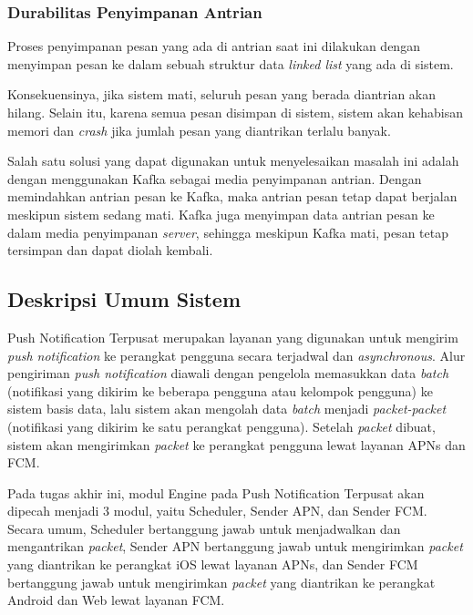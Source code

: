 \subsubsection{Durabilitas Penyimpanan Antrian}
\par Proses penyimpanan pesan yang ada di antrian saat ini dilakukan dengan menyimpan pesan ke dalam sebuah struktur data \textit{linked list} yang ada di sistem.
\par Konsekuensinya, jika sistem mati, seluruh pesan yang berada diantrian akan hilang. Selain itu, karena semua pesan disimpan di sistem, sistem akan kehabisan memori dan \textit{crash} jika jumlah pesan yang diantrikan terlalu banyak.
\par Salah satu solusi yang dapat digunakan untuk menyelesaikan masalah ini adalah dengan menggunakan Kafka sebagai media penyimpanan antrian. Dengan memindahkan antrian pesan ke Kafka, maka antrian pesan tetap dapat berjalan meskipun sistem sedang mati. Kafka juga menyimpan data antrian pesan ke dalam media penyimpanan \textit{server}, sehingga meskipun Kafka mati, pesan tetap tersimpan dan dapat diolah kembali.

\subsection{Deskripsi Umum Sistem}
\par Push Notification Terpusat merupakan layanan yang digunakan untuk mengirim \textit{push notification} ke perangkat pengguna secara terjadwal dan \textit{asynchronous}. Alur pengiriman \textit{push notification} diawali dengan pengelola memasukkan data \textit{batch} (notifikasi yang dikirim ke beberapa pengguna atau kelompok pengguna) ke sistem basis data, lalu sistem akan mengolah data \textit{batch} menjadi \textit{packet-packet} (notifikasi yang dikirim ke satu perangkat pengguna). Setelah \textit{packet} dibuat, sistem akan mengirimkan \textit{packet} ke perangkat pengguna lewat layanan APNs dan FCM.
\par Pada tugas akhir ini, modul Engine pada Push Notification Terpusat akan dipecah menjadi 3 modul, yaitu Scheduler, Sender APN, dan Sender FCM. Secara umum, Scheduler bertanggung jawab untuk menjadwalkan dan mengantrikan \textit{packet}, Sender APN bertanggung jawab untuk mengirimkan \textit{packet} yang diantrikan ke perangkat iOS lewat layanan APNs, dan Sender FCM bertanggung jawab untuk mengirimkan \textit{packet} yang diantrikan ke perangkat Android dan Web lewat layanan FCM.

